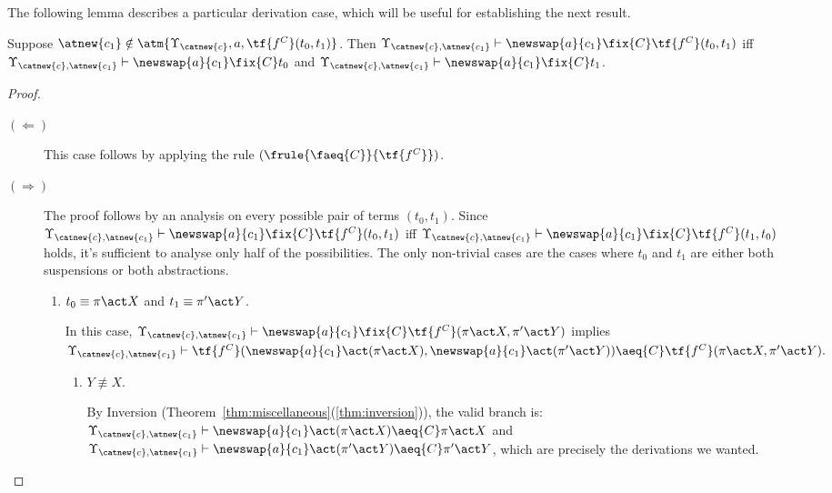 The following lemma describes a particular derivation case, which will be useful for establishing the next result.

\begin{lemma}\label{alemma:characterization-fix-commutative}
    Suppose $\atnew{c_1}\notin \atm{\Upsilon_{\catnew{c}},a,\tf{f^C}(t_0,t_1)}$. Then $\Upsilon_{\catnew{c},\atnew{c_1}} \vdash \newswap{a}{c_1}\fix{C} \tf{f^C}(t_0,t_1)$ iff $\Upsilon_{\catnew{c},\atnew{c_1}}\vdash \newswap{a}{c_1}\fix{C} t_0$ and $\Upsilon_{\catnew{c},\atnew{c_1}}\vdash \newswap{a}{c_1}\fix{C} t_1$.
\end{lemma}

\begin{proof}
\begin{description}
    \item[$(\Leftarrow)$] This case follows by applying the rule $(\frule{\faeq{C}}{\tf{f^C}})$.

    \item[$(\Rightarrow)$]

    The proof follows by an analysis on every possible pair of terms $(t_0,t_1)$. Since $\Upsilon_{\catnew{c},\atnew{c_1}} \vdash \newswap{a}{c_1}\fix{C} \tf{f^C}(t_0,t_1)$ iff $\Upsilon_{\catnew{c},\atnew{c_1}} \vdash \newswap{a}{c_1}\fix{C} \tf{f^C}(t_1,t_0)$ holds, it's sufficient to analyse only half of the possibilities. The only non-trivial cases are the cases where $t_0$ and $t_1$ are either both suspensions or both abstractions.

    \begin{enumerate}
        \item $t_0 \equiv \pi\act X$ and $t_1 \equiv \pi'\act Y$.

        In this case, $\Upsilon_{\catnew{c},\atnew{c_1}} \vdash \newswap{a}{c_1}\fix{C} \tf{f^C}(\pi\act X,\pi'\act Y)$ implies $ \Upsilon_{\catnew{c},\atnew{c_1}} \vdash \tf{f^C}(\newswap{a}{c_1}\act(\pi\act X),\newswap{a}{c_1}\act(\pi'\act Y))\aeq{C} \tf{f^C}(\pi\act X,\pi'\act Y).$


        \begin{enumerate}
            \item $Y\not\equiv X$.

            By Inversion (Theorem~\ref{thm:miscellaneous}(\ref{thm:inversion})), the valid branch is: $\Upsilon_{\catnew{c},\atnew{c_1}} \vdash \newswap{a}{c_1}\act(\pi\act X) \aeq{C}\pi\act X$ and $\Upsilon_{\catnew{c},\atnew{c_1}} \vdash \newswap{a}{c_1}\act(\pi'\act Y)\aeq{C}\pi'\act Y$, which are precisely the derivations we wanted.


\end{enumerate}
\end{enumerate}
\end{description}
\end{proof}
